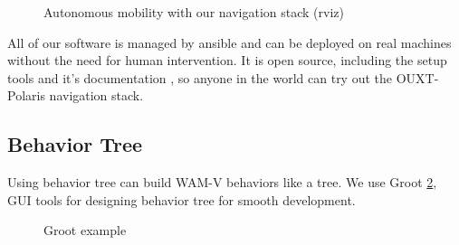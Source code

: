 \documentclass[lettersize,journal]{IEEEtran}
\begin{document}
\begin{figure}[H]
    \begin{center}
    \end{center}
    \caption{Autonomous mobility with our navigation stack (rviz)}
    \label{fig:whill}
\end{figure}

All of our software is managed by ansible and can be deployed on real machines without the need for human intervention.
It is open source, including the setup tools \cite{ouxt_automation} and it's documentation \cite{documentation_software},
so anyone in the world can try out the OUXT-Polaris navigation stack.

\subsection{Behavior Tree}
Using behavior tree can build WAM-V behaviors like a tree.  
We use Groot \ref{fig:Groot}, GUI tools for designing behavior tree for smooth development.

\begin{figure}[H]
  \begin{center}
  \end{center}
  \caption{Groot example}
  \label{fig:Groot}
\end{figure}
\end{document}
